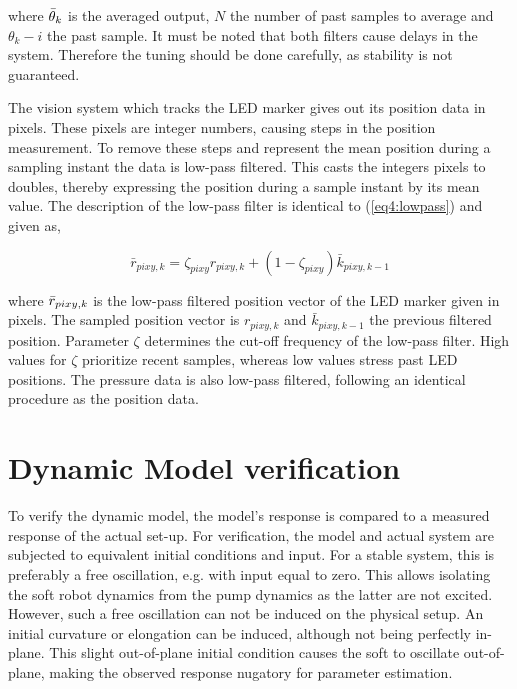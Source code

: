 where $\Bar{\theta}_k$ is the averaged output, $N$ the number of past samples to average and $\theta_k-i$ the past sample. It must be noted that both filters cause delays in the system. Therefore the tuning should be done carefully, as stability is not guaranteed.

The vision system which tracks the LED marker gives out its position data in pixels. These pixels are integer numbers, causing steps in the position measurement. To remove these steps and represent the mean position during a sampling instant the data is low-pass filtered. This casts the integers pixels to doubles, thereby expressing the position during a sample instant by its mean value. The description of the low-pass filter is identical to (\ref{eq4:lowpass}) and given as,

\begin{equation}
\bar{r}_{pixy,k} = \zeta_{pixy} r_{pixy,k} + (1-\zeta_{pixy})\bar{k}_{pixy,k-1}
\label{eq5:lowpass}
\end{equation}

where $\Bar{r}_{pixy,k}$ is the low-pass filtered position vector of the LED marker given in pixels. The sampled position vector is $r_{pixy,k}$ and $\bar{k}_{pixy,k-1}$ the previous filtered position. Parameter $\zeta$ determines the cut-off frequency of the low-pass filter. High values for $\zeta$ prioritize recent samples, whereas low values stress past LED positions. The pressure data is also low-pass filtered, following an identical procedure as the position data. 



\section{Dynamic Model verification}



To verify the dynamic model, the model's response is compared to a measured response of the actual set-up. For verification, the model and actual system are subjected to equivalent initial conditions and input. For a stable system, this is preferably a free oscillation, e.g. with input equal to zero. This allows isolating the soft robot dynamics from the pump dynamics as the latter are not excited. However, such a free oscillation can not be induced on the physical setup. An initial curvature or elongation can be induced, although not being perfectly in-plane. This slight out-of-plane initial condition causes the soft to oscillate out-of-plane, making the observed response nugatory for parameter estimation.


